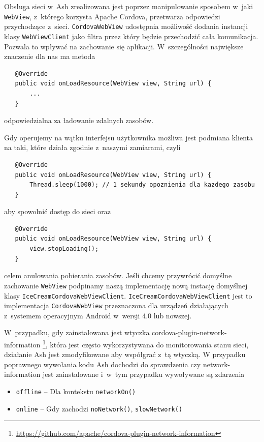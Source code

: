 \documentclass[brudnopis]{xmgr}
\begin{document}
Obsługa sieci w~Ash zrealizowana jest poprzez manipulowanie sposobem w~jaki \texttt{WebView}, z~którego korzysta Apache Cordova, przetwarza odpowiedzi przychodzące z~sieci. \texttt{CordovaWebView} udostępnia możliwość dodania instancji klasy \texttt{WebViewClient} jako filtra przez który będzie przechodzić cała komunikacja. Pozwala to wpływać na zachowanie się aplikacji. W~szczególności największe znaczenie dla nas ma metoda

\begin{lstlisting}
   @Override
   public void onLoadResource(WebView view, String url) {
       ...
   }
\end{lstlisting}

odpowiedzialna za ładowanie zdalnych zasobów.

Gdy operujemy na wątku interfejsu użytkownika możliwa jest podmiana klienta na taki, które działa zgodnie z~naszymi zamiarami, czyli 

\begin{lstlisting}
   @Override
   public void onLoadResource(WebView view, String url) {
       Thread.sleep(1000); // 1 sekundy opoznienia dla kazdego zasobu
   }
\end{lstlisting}

aby spowolnić dostęp do sieci oraz

\begin{lstlisting}
   @Override
   public void onLoadResource(WebView view, String url) {
       view.stopLoading();
   }
\end{lstlisting}

celem anulowania pobierania zasobów. Jeśli chcemy przywrócić domyślne zachowanie \texttt{WebView} podpinamy naszą implementację nową instację domyślnej klasy \texttt{IceCreamCordovaWebViewClient}. \texttt{IceCreamCordovaWebViewClient} jest to implementacja \texttt{CordovaWebView} przeznaczona dla urządzeń działających z~systemem operacyjnym Android w~wersji 4.0 lub nowszej.

W~przypadku, gdy zainstalowana jest wtyczka cordova-plugin-network-information \footnote{ \url{https://github.com/apache/cordova-plugin-network-information} }, która jest często wykorzystywana do monitorowania stanu sieci, działanie Ash jest zmodyfikowane aby współgrać z~tą wtyczką. W przypadku poprawnego wywołania kodu Ash dochodzi do sprawdzenia czy network-information jest zainstalowane i~w~tym przypadku wywoływane są zdarzenia

\begin{itemize}
  \item \texttt{offline} -- Dla kontekstu \texttt{networkOn()} 
  \item \texttt{online} -- Gdy zachodzi \texttt{noNetwork()}, \texttt{slowNetwork()}
\end{itemize}
\end{document}
